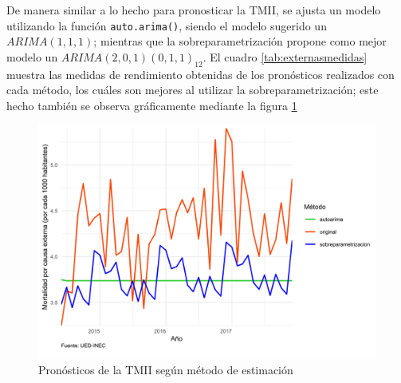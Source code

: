 \documentclass[
]{article}
\begin{document}
De manera similar a lo hecho para pronosticar la TMII, se ajusta un
modelo utilizando la función \texttt{auto.arima()}, siendo el modelo
sugerido un \(ARIMA(1,1,1)\); mientras que la sobreparametrización
propone como mejor modelo un \(ARIMA(2,0,1)(0,1,1)_{12}\). El cuadro
\ref{tab:externasmedidas} muestra las medidas de rendimiento obtenidas
de los pronósticos realizados con cada método, los cuáles son mejores al
utilizar la sobreparametrización; este hecho también se observa
gráficamente mediante la figura \ref{fig:externasplotpronostico}

\begin{table}[!h]

\caption{\label{tab:unnamed-chunk-15}\label{tab:externasmedidas}Medidas de rendimiento según método de estimación para la Mortalidad por causa externa}
\centering
{}
\end{table}

\begin{figure}[!h]
\includegraphics[width=1\linewidth,height=1\textheight]{Tesis_files/figure-latex/externasplotpronostico-1} \caption{Pronósticos de la TMII según método de estimación}\label{fig:externasplotpronostico}
\end{figure}
\end{document}
